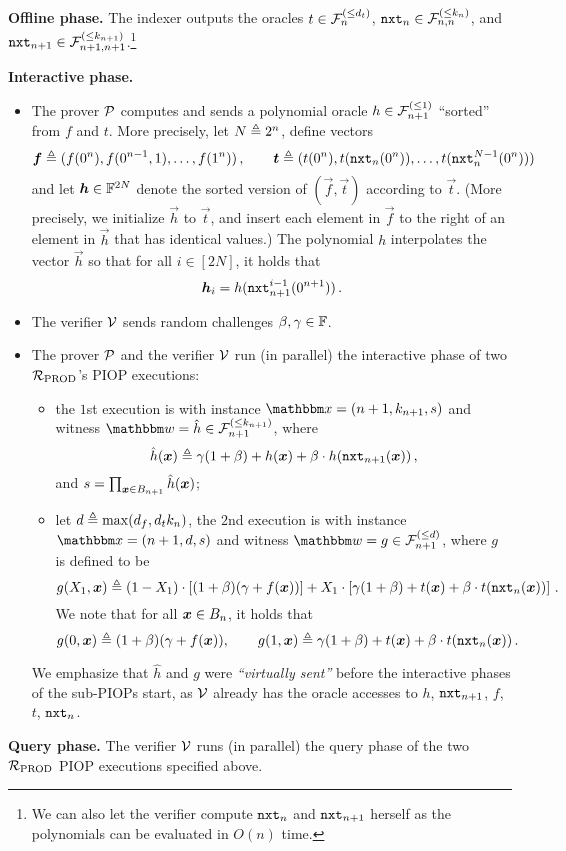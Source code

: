\textbf{Offline phase.}
The indexer outputs the oracles $t \in {\mathcal{F}}_{n}^{(\le{d_t})}$, $\mathtt{nxt}_{n} \in {\mathcal{F}}_{n,n}^{(\le{k_{n}})}$,
and $\mathtt{nxt}_{n+1} \in {\mathcal{F}}_{n+1,n+1}^{(\le{k_{n+1}})}$.\footnote{We can also let the verifier 
compute $\mathtt{nxt}_{n}$ and $\mathtt{nxt}_{n+1}$ herself as the polynomials can be evaluated in $O(n)$ time.}

\textbf{Interactive phase.} 
\begin{itemize}
    \item The prover $\mathcal{P}$ computes and sends a polynomial oracle $h \in {\mathcal{F}}_{n+1}^{(\le{1})}$ ``sorted'' from $f$ and $t$.
        More precisely, let $N \mathrel{\triangleq} 2^n$, define vectors
        \[
            \boldsymbol{f} \mathrel{\triangleq} (f(0^n), f(0^{n-1}, 1), \dots, f(1^n) )\,, \qquad 
            \boldsymbol{t} \mathrel{\triangleq} (t(0^n), t(\mathtt{nxt}_{n}(0^n)), \dots, t(\mathtt{nxt}_{n}^{N-1}(0^n))) 
        \]
        and let $\boldsymbol{h} \in \mathbb{F}^{2N}$ denote the sorted version of $(\vec{f}, \vec{t})$ according to $\vec{t}$.
        (More precisely, we initialize $\vec{h}$ to $\vec{t}$, and 
        insert each element in $\vec{f}$ to the right of an element in $\vec{h}$ that has identical values.)
        The polynomial $h$ interpolates the vector $\vec{h}$ so that for all $i \in [2N]$,
        it holds that
        \[
            \boldsymbol{h}_i = h(\mathtt{nxt}_{n+1}^{i-1}(0^{n+1})) \,.
        \]
        
    \item The verifier $\mathcal{V}$ sends random challenges $\beta, \gamma \in \mathbb{F}$.
    
    \item The prover $\mathcal{P}$ and the verifier $\mathcal{V}$ run (in parallel) the interactive phase 
    of two ${\mathcal{R}}_{\text{PROD}}$'s PIOP executions:
        \begin{itemize}
            \item the $1$st execution is with instance $\instR = (n+1, \sps{n+1}, s)$ and
                witness $\witR = \hat{h} \in \bdp{n+1}{\sps{n+1}}$, where 
                \[
                    \hat{h}(\boldsymbol{x}) \mathrel{\triangleq} \gamma(1+\beta) + h(\boldsymbol{x}) + \beta \cdot h(\mathtt{nxt}_{n+1}(\boldsymbol{x})) \,,
                \] and $s = \prod_{\boldsymbol{x}\in B_{n+1}} \hat{h}(\boldsymbol{x})$;
                
            \item let $d \mathrel{\triangleq} \max(d_f, d_t k_{n})$, the $2$nd execution is with instance 
                $\instR = (n+1, d, s)$ and 
                witness $\witR = g \in \bdp{n+1}{d}$, where $g$ is defined to be 
                \[
                    g(X_1, \boldsymbol{x}) \mathrel{\triangleq} (1-X_1) \cdot \left[(1+\beta)(\gamma + f(\boldsymbol{x}))\right]
                                    + X_1 \cdot \left[\gamma(1+\beta) + t(\boldsymbol{x}) + \beta \cdot t(\mathtt{nxt}_{n}(\boldsymbol{x}))\right]\,.
                \]
                We note that for all $\boldsymbol{x} \in B_{n}$, it holds that
                \[
                    g(0, \boldsymbol{x}) \mathrel{\triangleq} (1+\beta)(\gamma + f(\boldsymbol{x})), \qquad 
                    g(1, \boldsymbol{x}) \mathrel{\triangleq} \gamma(1+\beta) + t(\boldsymbol{x}) + \beta \cdot t(\mathtt{nxt}_{n}(\boldsymbol{x})) \,.
                \]
        \end{itemize}
        We emphasize that $\hat{h}$ and $g$ were \emph{``virtually sent''} before the interactive phases of the sub-PIOPs start,
        as $\mathcal{V}$ already has the oracle accesses to $h$, $\mathtt{nxt}_{n+1}$, $f$, $t$, $\mathtt{nxt}_{n}$.
\end{itemize}

\textbf{Query phase.}
The verifier $\mathcal{V}$ runs (in parallel) the query phase of the two ${\mathcal{R}}_{\text{PROD}}$ PIOP 
executions specified above.

